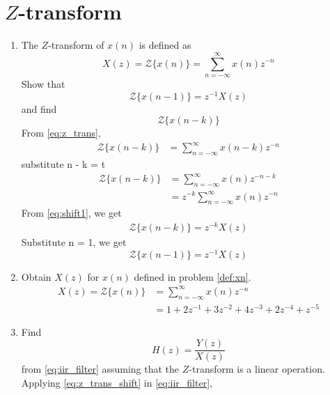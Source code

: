 \documentclass[journal,12pt,twocolumn]{IEEEtran}
\renewcommand\thesection{\arabic{section}}
\begin{document}
\section{$Z$-transform}
\begin{enumerate}[label=\thesection.\arabic*]
\item The $Z$-transform of $x(n)$ is defined as
%
\begin{equation}
\label{eq:z_trans}
X(z)={\mathcal {Z}}\{x(n)\}=\sum _{n=-\infty }^{\infty }x(n)z^{-n}
\end{equation}
%
Show that
\begin{equation}
\label{eq:shift1}
{\mathcal {Z}}\{x(n-1)\} = z^{-1}X(z)
\end{equation}
and find
\begin{equation}
	{\mathcal {Z}}\{x(n-k)\} 
\end{equation}
\solution From \eqref{eq:z_trans},
\begin{align}
{\mathcal {Z}}\{x(n-k)\} &=\sum _{n=-\infty }^{\infty }x(n-k)z^{-n}
\end{align}
substitute n - k = t
\begin{align}
{\mathcal {Z}}\{x(n-k)\} &=\sum _{n=-\infty }^{\infty }x(n)z^{-n-k}\\ &= z^{-k}\sum _{n=-\infty }^{\infty }x(n)z^{-n}
\end{align}
From \eqref{eq:shift1}, we get\\
\begin{align}
{\mathcal {Z}}\{x(n-k)\} = z^{-k}X(z)
\end{align}
Substitute n = 1, we  get
\begin{equation}
\label{eq:z_trans_shift}
	{\mathcal {Z}}\{x(n-1)\} = z^{-1}X(z)
\end{equation}
\item Obtain $X(z)$ for $x(n)$ defined in problem 
	\ref{def:xn}.
\solution 
\begin{align}
X(z)={\mathcal {Z}}\{x(n)\} &= \sum _{n=-\infty }^{\infty }x(n)z^{-n}\\ &= 1+2z^{-1}+3z^{-2}+4z^{-3}+2z^{-4}+z^{-5}
\end{align}
\item Find
%
\begin{equation}
H(z) = \frac{Y(z)}{X(z)}
\end{equation}
%
from  \eqref{eq:iir_filter} assuming that the $Z$-transform is a linear operation.
\\
\solution  Applying \eqref{eq:z_trans_shift} in \eqref{eq:iir_filter},
\begin{align}

\end{align}
\end{enumerate}
\end{document}
